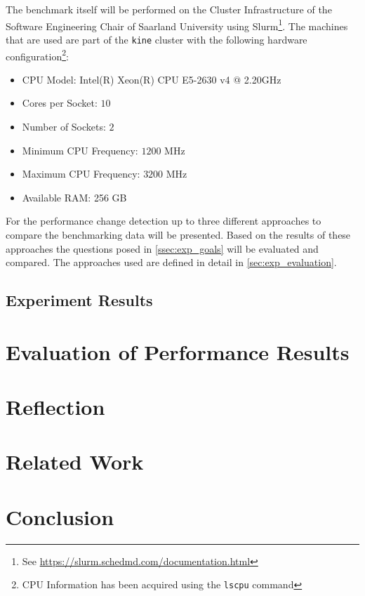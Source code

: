 \documentclass[	runningheads,
				a4paper]{llncs}
\begin{document}
The benchmark itself will be performed on the Cluster Infrastructure of the Software Engineering Chair of Saarland University using Slurm\footnote{See \url{https://slurm.schedmd.com/documentation.html}}. The machines that are used are part of the \texttt{kine} cluster with the following hardware configuration\footnote{CPU Information has been acquired using the \texttt{lscpu} command}:

\begin{itemize}
	\item CPU Model: Intel(R) Xeon(R) CPU E5-2630 v4 @ 2.20GHz
	\item Cores per Socket: $10$
	\item Number of Sockets: $2$
	\item Minimum CPU Frequency: $1200$ MHz
	\item Maximum CPU Frequency: $3200$ MHz
	\item Available RAM: 256 GB
\end{itemize}

For the performance change detection up to three different approaches to compare the benchmarking data will be presented. Based on the results of these approaches the questions posed in \autoref{ssec:exp_goals} will be evaluated and compared. The approaches used are defined in detail in \autoref{sec:exp_evaluation}.

	\subsection{Experiment Results}

\section{Evaluation of Performance Results}
\label{sec:exp_evaluation}

\section{Reflection}

\section{Related Work}

\section{Conclusion}
	
	
	
	
	
\end{document}
